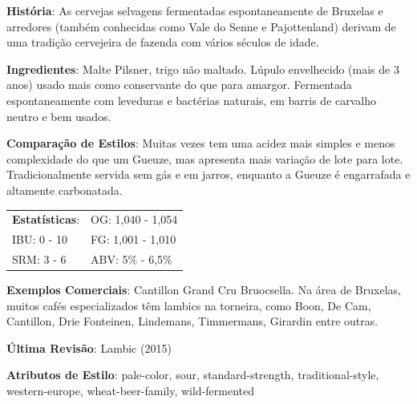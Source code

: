\textbf{História}: As cervejas selvagens fermentadas espontaneamente de Bruxelas e arredores (também conhecidas como Vale do Senne e Pajottenland) derivam de uma tradição cervejeira de fazenda com vários séculos de idade.

\textbf{Ingredientes}: Malte Pilsner, trigo não maltado. Lúpulo envelhecido (mais de 3 anos) usado mais como conservante do que para amargor. Fermentada espontaneamente com leveduras e bactérias naturais, em barris de carvalho neutro e bem usados.

\textbf{Comparação de Estilos}: Muitas vezes tem uma acidez mais simples e menos complexidade do que um Gueuze, mas apresenta mais variação de lote para lote. Tradicionalmente servida sem gás e em jarros, enquanto a Gueuze é engarrafada e altamente carbonatada.

\begin{tabular}{@{}p{35mm}p{35mm}@{}}
  \textbf{Estatísticas}: & OG: 1,040 - 1,054 \\
  IBU: 0 - 10  & FG: 1,001 - 1,010  \\
  SRM: 3 - 6  & ABV: 5\% - 6,5\%
\end{tabular}

\textbf{Exemplos Comerciais}: Cantillon Grand Cru Bruocsella. Na área de Bruxelas, muitos cafés especializados têm lambics na torneira, como Boon, De Cam, Cantillon, Drie Fonteinen, Lindemans, Timmermans, Girardin entre outras.

\textbf{Última Revisão}: Lambic (2015)

\textbf{Atributos de Estilo}: pale-color, sour, standard-strength, traditional-style, western-europe, wheat-beer-family, wild-fermented
